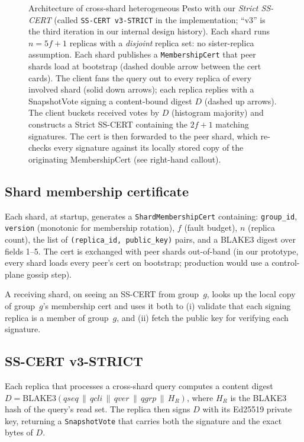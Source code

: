 \documentclass[letterpaper,twocolumn,10pt]{article}
\begin{document}
\begin{figure}[t]
\begin{tikzpicture}
\end{tikzpicture}
\caption{Architecture of cross-shard heterogeneous Pesto with our
\emph{Strict SS-CERT} (called \texttt{SS-CERT v3-STRICT} in the
implementation; ``v3'' is the third iteration in our internal
design history). Each shard runs $n=5f{+}1$ replicas with a
\emph{disjoint} replica set: no sister-replica assumption. Each
shard publishes a \texttt{MembershipCert} that peer shards load at
bootstrap (dashed double arrow between the cert cards). The client
fans the query out to every replica of every involved shard (solid
down arrows); each replica replies with a SnapshotVote signing a
content-bound digest $D$ (dashed up arrows). The client buckets
received votes by $D$ (histogram majority) and constructs a Strict
SS-CERT containing the $2f{+}1$ matching signatures. The cert is
then forwarded to the peer shard, which re-checks every signature
against its locally stored copy of the originating MembershipCert
(see right-hand callout).}
\label{fig:arch}
\end{figure}

\subsection{Shard membership certificate}

Each shard, at startup, generates a \texttt{ShardMembershipCert}
containing: \texttt{group\_id}, \texttt{version} (monotonic for
membership rotation), $f$ (fault budget), $n$ (replica count), the
list of \texttt{(replica\_id, public\_key)} pairs, and a BLAKE3 digest
over fields 1--5. The cert is exchanged with peer shards out-of-band
(in our prototype, every shard loads every peer's cert on bootstrap;
production would use a control-plane gossip step).

A receiving shard, on seeing an SS-CERT from group~$g$, looks up the
local copy of group~$g$'s membership cert and uses it both to (i)
validate that each signing replica is a member of group~$g$, and (ii)
fetch the public key for verifying each signature.

\subsection{SS-CERT v3-STRICT}

Each replica that processes a cross-shard query computes a content
digest $D = \mathrm{BLAKE3}(\textit{qseq} \,\|\, \textit{qcli} \,\|\,
\textit{qver} \,\|\, \textit{qgrp} \,\|\, H_R)$, where $H_R$ is the
BLAKE3 hash of the query's read set. The replica then signs $D$ with
its Ed25519 private key, returning a \texttt{Snapshot\-Vote} that carries
both the signature and the exact bytes of $D$.
\end{document}
